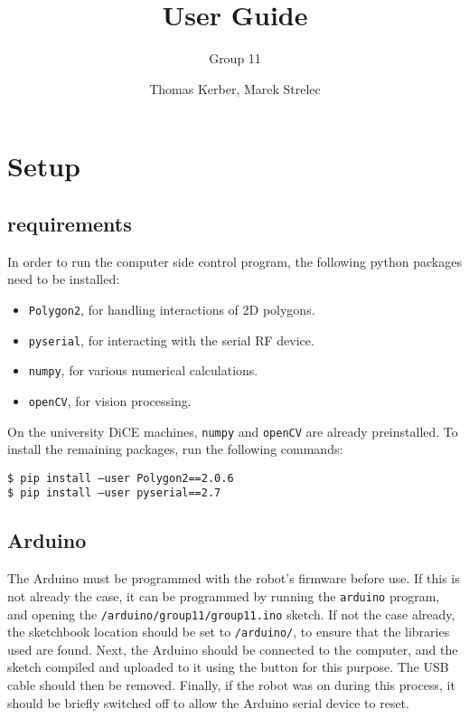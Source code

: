 \documentclass[a4paper,12pt]{scrartcl}
\author{Thomas Kerber, Marek Strelec}
\title{User Guide}
\subtitle{Group 11}
\newcommand{\shellcmd}[1]{\indent\indent\texttt{\footnotesize\$ #1}}
\begin{document}
\maketitle
\section{Setup}
\subsection{requirements}

In order to run the computer side control program, the following python
packages need to be installed:

\begin{itemize}
\item \texttt{Polygon2}, for handling interactions of 2D polygons.
\item \texttt{pyserial}, for interacting with the serial RF device.
\item \texttt{numpy}, for various numerical calculations.
\item \texttt{openCV}, for vision processing.
\end{itemize}

On the university DiCE machines, \texttt{numpy} and \texttt{openCV} are already
preinstalled. To install the remaining packages, run the following commands:

\shellcmd{pip install --user Polygon2==2.0.6} \\
\shellcmd{pip install --user pyserial==2.7} \\

\subsection{Arduino}

The Arduino must be programmed with the robot's firmware before use. If this is
not already the case, it can be programmed by running the \texttt{arduino}
program, and opening the \texttt{/arduino/group11/group11.ino} sketch. If not
the case already, the sketchbook location should be set to \texttt{/arduino/},
to ensure that the libraries used are found. Next, the Arduino should be
connected to the computer, and the sketch compiled and uploaded to it using the
button for this purpose. The USB cable should then be removed. Finally, if the
robot was on during this process, it should be briefly switched off to allow
the Arduino serial device to reset.
\end{document}
